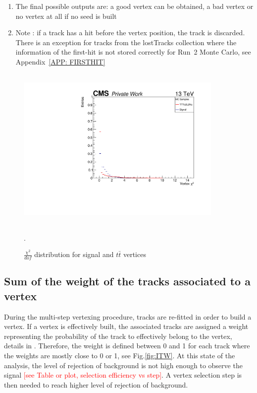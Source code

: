 \documentclass{cernatlasnote}
\begin{document}
\begin{appendices}
\begin{enumerate}
    \item The final possible outputs are: a good vertex can be obtained, a bad vertex or no vertex at all if no seed is built
    \item Note : if a track has a hit before the vertex position, the track is discarded. There is an exception for tracks from the lostTracks collection where the information of the first-hit is not stored correctly for Run~2 Monte Carlo, see Appendix~\ref{APP: FIRSTHIT} 
\end{enumerate}
\begin{figure}[ht]
\centering
\includegraphics[height=8cm, width=10cm, trim= 0cm 0cm 0cm 0cm,clip]{images/VTXBDT/plot_VtxChi.pdf}
\caption{\label{fig:VTXChi2} $\frac{\chi^2}{dof}$ distribution for signal and $t\bar{t}$ vertices}. 
\end{figure} 
\pagebreak

\subsection{Sum of the weight of the tracks associated to a vertex}
\label{APP: MWT}
During the multi-step vertexing procedure, tracks are re-fitted in order to build a vertex. If a vertex is effectively built, the associated tracks are assigned a weight representing the probability of the track to effectively belong to the vertex, details in \cite{AVF}. Therefore, the weight is defined between 0 and 1 for each track where the weights are mostly close to 0 or 1, see Fig.\ref{fig:ITW}. 
At this state of the analysis, the level of rejection of background is not high enough to observe the signal \textcolor{red}{[see Table or plot, selection efficiency vs step]}. A vertex selection step is then needed to reach higher level of rejection of background. \\


\end{appendices}
\end{document}
